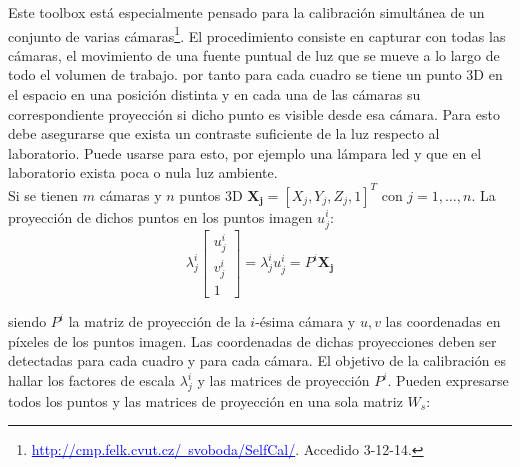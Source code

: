  Este toolbox está especialmente pensado para la calibración simultánea de un conjunto de varias cámaras\footnote{\textcolor{blue}{\underline{http://cmp.felk.cvut.cz/~svoboda/SelfCal/}}. Accedido 3-12-14.}. El procedimiento consiste en capturar con todas las cámaras, el movimiento de una fuente puntual de luz que se mueve a lo largo de todo el volumen de trabajo. por tanto para cada cuadro se tiene un punto 3D en el espacio en una posición distinta y en cada una de las cámaras su correspondiente proyección si dicho punto es visible desde esa cámara. Para esto debe asegurarse que exista un contraste suficiente de la luz respecto al laboratorio. Puede usarse para esto, por ejemplo una lámpara led y que en el laboratorio exista poca o nula luz ambiente.\\
 
 
 Si se tienen $m$ cámaras y $n$ puntos 3D  
$\mathbf{X_j} = [X_j, Y_j, Z_j,1]^T$ con $j=1,\ldots,n$. La proyección de dichos puntos en los puntos imagen $u_j^i$:
\[ \lambda_j^i
\begin{bmatrix}
u_j^i \\
v_j^i \\
1
\end{bmatrix} 
 = \lambda_j^i u_j^i = P^i \mathbf{X_j}
\]

siendo $P^i$ la matriz de proyección de la $i$-ésima cámara y $u,v$ las coordenadas en píxeles de los puntos imagen. Las coordenadas de dichas proyecciones deben ser detectadas para cada cuadro y para cada cámara. El objetivo de la calibración es hallar los factores de escala $\lambda_j^i$ y las matrices de proyección $P^i$. Pueden expresarse todos los puntos y las matrices de proyección en una sola matriz $W_s$:

